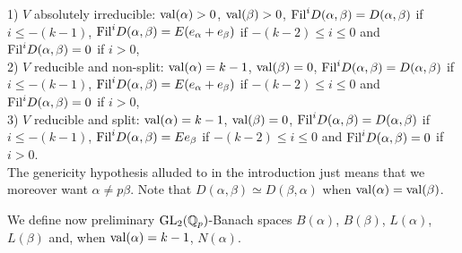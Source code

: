 \documentclass[11pt]{amsart}
\def\Q{{\mathbb Q}_p}
\def\G{{\rm GL}_2(\Q)}
\begin{document}
1) $V$ absolutely irreducible: ${\rm val}(\alpha)>0$, ${\rm
   val}(\beta)>0$, ${\rm Fil}^iD(\alpha,\beta)=D(\alpha,\beta)$ if
   $i\leq -(k-1)$, ${\rm
   Fil}^iD(\alpha,\beta)=E(e_{\alpha}+e_{\beta})$ if $-(k-2)\leq i\leq
   0$ and ${\rm Fil}^iD(\alpha,\beta)=0$ if $i>0$,\\  
 
2) $V$ reducible and non-split: ${\rm val}(\alpha)=k-1$, ${\rm
   val}(\beta)=0$, ${\rm Fil}^iD(\alpha,\beta)=D(\alpha,\beta)$ if
   $i\leq -(k-1)$, ${\rm
   Fil}^iD(\alpha,\beta)=E(e_{\alpha}+e_{\beta})$ if $-(k-2)\leq i\leq
   0$ and ${\rm Fil}^iD(\alpha,\beta)=0$ if $i>0$,\\  
 
3) $V$ reducible and split: ${\rm val}(\alpha)=k-1$, ${\rm
   val}(\beta)=0$, ${\rm Fil}^iD(\alpha,\beta)=D(\alpha,\beta)$ if
   $i\leq -(k-1)$, ${\rm Fil}^iD(\alpha,\beta)=Ee_{\beta}$ if
   $-(k-2)\leq i\leq 0$ and ${\rm Fil}^iD(\alpha,\beta)=0$ if $i>0$.\\  
 
The genericity hypothesis alluded to in the introduction just means
that we moreover want $\alpha\ne p\beta$. Note that
$D(\alpha,\beta)\simeq D(\beta,\alpha)$ when ${\rm val}(\alpha)={\rm
  val}(\beta)$.
 
We define now preliminary $\G$-Banach spaces $B(\alpha)$, $B(\beta)$,
$L(\alpha)$, $L(\beta)$ and, when ${\rm val}(\alpha)=k-1$,
$N(\alpha)$. 
 
\end{document}
